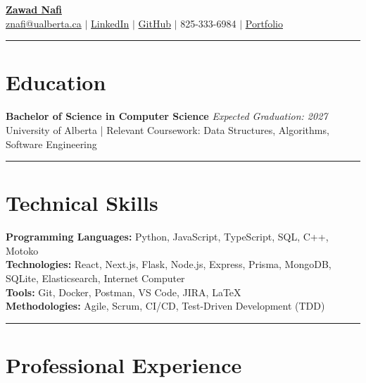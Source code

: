 \documentclass[a4paper,10pt]{article}
\begin{document}
\begin{center}
    {\LARGE \textbf{\href{https://myportfolioxznafi.vercel.app/}{Zawad Nafi}}} \\
    \vspace{2mm}
    \small
    \href{mailto:znafi@ualberta.ca}{znafi@ualberta.ca} \hspace{3mm} $\vert$ \hspace{3mm}
    \href{https://www.linkedin.com/in/zawadnafi}{LinkedIn} \hspace{3mm} $\vert$ \hspace{3mm}
    \href{https://github.com/znafi}{GitHub} \hspace{3mm} $\vert$ \hspace{3mm} 825-333-6984\hspace{3mm} $\vert$ \href{https://myportfolioxznafi.vercel.app/}{Portfolio}
\end{center}
\vspace{-4mm}
\hrule \vspace{6pt}

\section*{Education}
\textbf{Bachelor of Science in Computer Science} \hfill \textit{Expected Graduation: 2027} \\
University of Alberta | Relevant Coursework: Data Structures, Algorithms, Software Engineering
\vspace{6pt}
\hrule \vspace{6pt}

\section*{Technical Skills}
\textbf{Programming Languages:} Python, JavaScript, TypeScript, SQL, C++, Motoko \\
\textbf{Technologies:} React, Next.js, Flask, Node.js, Express, Prisma, MongoDB, SQLite, Elasticsearch, Internet Computer \\
\textbf{Tools:} Git, Docker, Postman, VS Code, JIRA, LaTeX \\
\textbf{Methodologies:} Agile, Scrum, CI/CD, Test-Driven Development (TDD)
\vspace{6pt}
\hrule \vspace{6pt}

\section*{Professional Experience}
\end{document}
